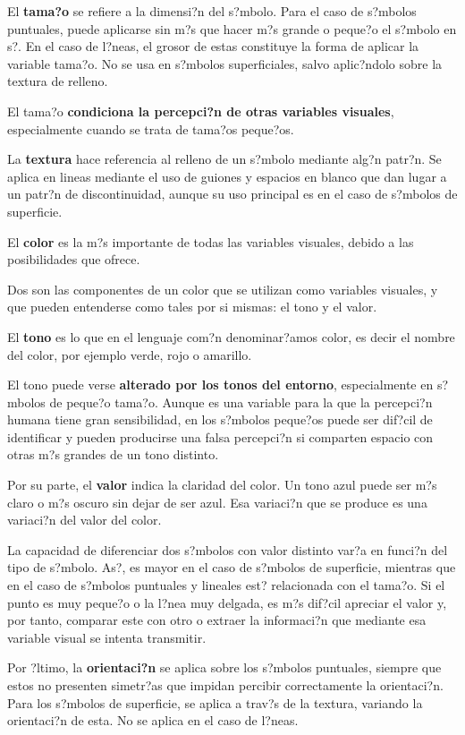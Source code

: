 El \textbf{tama?o} se refiere a la dimensi?n del s?mbolo. Para el caso de s?mbolos puntuales, puede aplicarse sin m?s que hacer m?s grande o peque?o el s?mbolo en s?. En el caso de l?neas, el grosor de estas constituye la forma de aplicar la variable tama?o. No se usa en s?mbolos superficiales, salvo aplic?ndolo sobre la textura de relleno.

El tama?o \textbf{condiciona la percepci?n de otras variables visuales}, especialmente cuando se trata de tama?os peque?os. 

La \textbf{textura} hace referencia al relleno de un s?mbolo mediante alg?n patr?n. Se aplica en lineas mediante el uso de guiones y espacios en blanco que dan lugar a un patr?n de discontinuidad, aunque su uso principal es en el caso de s?mbolos de superficie.

El \textbf{color} es la m?s importante de todas las variables visuales, debido a las posibilidades que ofrece.

Dos son las componentes de un color que se utilizan como variables visuales, y que pueden entenderse como tales por si mismas: el tono y el  valor. 

El \textbf{tono} es lo que en el lenguaje com?n denominar?amos color, es decir el nombre del color, por ejemplo verde, rojo o amarillo. 

El tono puede verse \textbf{alterado por los tonos del entorno}, especialmente en s?mbolos de peque?o tama?o. Aunque es una variable para la que la percepci?n humana tiene gran sensibilidad, en los s?mbolos peque?os puede ser dif?cil de identificar y pueden producirse una falsa percepci?n si comparten espacio con otras m?s grandes de un tono distinto. 

Por su parte, el \textbf{valor} indica la claridad del color. Un tono azul puede ser m?s claro o m?s oscuro sin dejar de ser azul. Esa variaci?n que se produce es una variaci?n del valor del color. 

La capacidad de diferenciar dos s?mbolos con valor distinto var?a en funci?n del tipo de s?mbolo. As?, es mayor en el caso de s?mbolos de superficie, mientras que en el caso de s?mbolos puntuales y lineales est? relacionada con el tama?o. Si el punto es muy peque?o o la l?nea muy delgada, es m?s dif?cil apreciar el valor y, por tanto, comparar este con otro o extraer la informaci?n que mediante esa variable visual se intenta transmitir.


Por ?ltimo, la \textbf{orientaci?n} se aplica sobre los s?mbolos puntuales, siempre que estos no presenten simetr?as que impidan percibir correctamente la orientaci?n. Para los s?mbolos de superficie, se aplica a trav?s de la textura, variando la orientaci?n de esta. No se aplica en el caso de l?neas.

